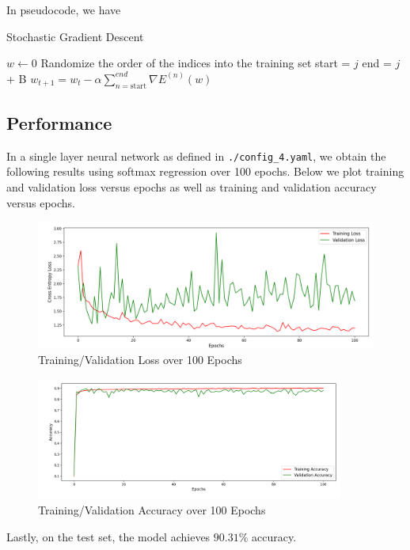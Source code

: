 In pseudocode, we have

\begin{algorithm}
	\caption{Stochastic Gradient Descent}
	\begin{algorithmic}
		\State $w \gets 0$
		\State Randomize the order of the indices into the training set
		\State start = $j$
		\State end = $j$ + B
		\State $w_{t + 1} = w_t - \alpha \sum_{n = \text{start}}^{end} \nabla
			E^{(n)}(w) $
		\EndFor
		\EndFor
	\end{algorithmic}
\end{algorithm}

\subsection{Performance}

In a single layer neural network as defined in \texttt{./config\_4.yaml}, we
obtain the following results using softmax regression over 100 epochs. Below we
plot training and validation loss versus epochs as well as training and
validation accuracy versus epochs.

\begin{figure}[hb]
	\centering
	\includegraphics[width=1.0\textwidth]{./images/loss.png}
	\caption{Training/Validation Loss over 100 Epochs}
\end{figure}

\begin{figure}[!ht]
	\centering
	\includegraphics[width=0.9\textwidth]{./images/acc.png}
	\caption{Training/Validation Accuracy over 100 Epochs}
\end{figure}


Lastly, on the test set, the model achieves $90.31 \%$ accuracy.
